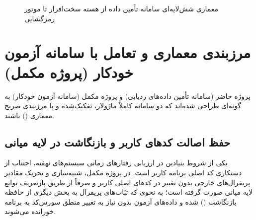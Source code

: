\begin{figure}[H]
\begin{latin}
\end{latin}
\caption{معماری شش‌لایه‌ای سامانه تأمین داده از هسته سخت‌افزار تا موتور رمزگشایی}
\label{fig:detailed_arch_flow}
\end{figure}
\clearpage

\section{مرزبندی معماری و تعامل با سامانه آزمون خودکار (پروژه مکمل)}
\label{sec:dual_arch_interaction}
پروژه حاضر (سامانه تأمین داده‌های ردیابی) و پروژه مکمل (سامانه آزمون خودکار) به گونه‌ای طراحی شده‌اند که دو سامانه کاملاً ماژولار، تفکیک‌شده و با مرزبندی صریح معماری () باشند.

\subsection{حفظ اصالت کدهای کاربر و بازنگاشت در لایه میانی}
یکی از شروط بنیادین در ارزیابی رفتارهای زمانی سیستم‌های نهفته، اجتناب از دستکاری کد اصلی برنامه کاربر است. در پروژه مکمل، شبیه‌سازی و تحریک مقادیر پریفرال‌های خارجی بدون تغییر در کدهای اصلی کاربر و صرفاً از طریق بازتعریف توابع لایه میانی  صورت گرفته است؛ به نحوی که ثبّات‌های پریفرال به بخش دیگری از حافظه بازنگاشت () شده و داده‌های آزمون بدون نیاز به تغییر منطق سورس‌کد به برنامه خورانده می‌شوند.


